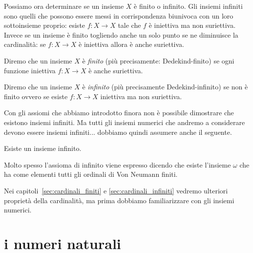Possiamo ora determinare se un insieme $X$ è finito o infinito.
Gli insiemi infiniti sono quelli che possono essere messi in corrispondenza 
biunivoca con un loro sottoinsieme proprio: esiste $f\colon X\to X$ 
tale che $f$ è iniettiva ma non suriettiva. 
Invece se un insieme è finito togliendo anche un solo punto
se ne diminuisce la cardinalità: se $f\colon X\to X$ è iniettiva
allora è anche suriettiva.

\begin{definition}[infinito]
  \label{def:infinito}%
  Diremo che un insieme $X$ è \emph{finito}
  (più precisamente: Dedekind-finito)
  se ogni funzione iniettiva $f\colon X\to X$ è anche suriettiva.
%

  Diremo che un insieme $X$ è \emph{infinito} 
  (più precisamente Dedekind-infinito)
  se non è finito ovvero
  se esiste $f\colon X\to X$ iniettiva ma non suriettiva.
%
\end{definition}

Con gli assiomi che abbiamo introdotto finora non è possibile dimostrare 
che esistono insiemi infiniti. 
Ma tutti gli insiemi numerici che andremo a considerare devono essere 
insiemi infiniti... dobbiamo quindi assumere anche il seguente. 

\begin{axiom}[infinito]
  \label{axiom:infinito}%
  Esiste un insieme infinito. 
\end{axiom}

Molto spesso l'assioma di infinito viene espresso dicendo che esiste 
l'insieme $\omega$ che ha come elementi tutti gli 
ordinali di Von Neumann finiti.
%
%

Nei capitoli~\ref{sec:cardinali_finiti} e \ref{sec:cardinali_infiniti}
vedremo ulteriori proprietà della cardinalità, ma prima 
dobbiamo familiarizzare con gli insiemi numerici.

\section{i numeri naturali}

